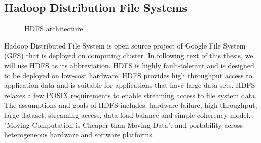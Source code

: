 \subsection{Hadoop Distribution File Systems}
\begin{figure}
  \begin{center}
   \caption{HDFS architecture \cite{HDFS}}
   \label{fig:hdfs_architecture}
  \end{center}
\end{figure}

Hadoop Distributed File System \cite{HDFS} is open source project of Google File System (GFS) \cite{ghemawat2003google} that is deployed on computing cluster. In following text of this thesis, we will use HDFS as its abbreviation. HDFS is highly fault-tolerant and is designed to be deployed on low-cost hardware. HDFS provides high throughput access to application data and is suitable for applications that have large data sets. HDFS relaxes a few POSIX requirements to enable streaming access to file system data. \cite{HDFS} The assumptions and goals of HDFS includes: hardware failure, high throughput, large dataset, streaming access, data load balance and simple coherency model, "Moving Computation is Cheaper than Moving Data", and portability across heterogeneous hardware and software platforms. 


